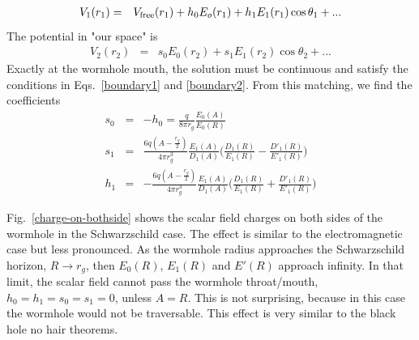\documentclass[prd, amsfonts, twocolumn, nofootinbib, showpacs]{revtex4}
\begin{document}
 \begin{eqnarray}
V_1 (r_1)&=& V_{\rm free}(r_1)+h_0 E_o(r_1)+h_1E_1(r_1)\cos\theta_1+...
\end{eqnarray}
 The potential in "our space" is
 \begin{eqnarray}
V_2 (r_2)&=& s_0 E_0(r_2)+s_1 E_1(r_2)\cos\theta_2+...
\end{eqnarray}
Exactly at the wormhole mouth, the solution must be continuous and satisfy the conditions in Eqs.~\eqref{boundary1} and \eqref{boundary2}. From this matching, we find the coefficients
\begin{eqnarray}
s_0&=&-h_0=\frac{q}{8\pi r_g}\frac{E_0(A)}{E_0(R)} \\
s_1&=& \frac{6q(A-\frac{r_g}{2})}{4\pi r_g^3}\frac{E_1(A)}{D_1(A)} \Big(\frac{D_1(R)}{E_1(R)}-\frac{D'_1(R)}{E'_1(R)}\Big)\\
h_1&=& -\frac{6q(A-\frac{r_g}{2})}{4\pi r_g^3}\frac{E_1(A)}{D_1(A)} \Big(\frac{D_1(R)}{E_1(R)}+\frac{D'_1(R)}{E'_1(R)}\Big)
\end{eqnarray}

Fig.~\ref{charge-on-bothside} shows the scalar field charges on both sides of the wormhole in the Schwarzschild case. The effect is similar to the electromagnetic case but less pronounced. As the wormhole radius approaches the Schwarzschild horizon, $R \rightarrow r_g$, then $E_0(R)$, $E_1(R)$ and $E'(R)$ approach infinity. In that limit, the scalar field cannot pass the wormhole throat/mouth, $h_0=h_1=s_0=s_1=0$, unless $A=R$. This is not surprising, because in this case the wormhole would not be traversable. This effect is very similar to the black hole no hair theorems.
\end{document}
